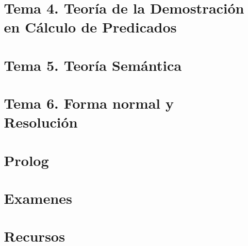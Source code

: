 \documentclass[12pt]{report} %
\begin{document}
\part{Tema 4. Teoría de la Demostración en Cálculo de Predicados}





\part{Tema 5. Teoría  Semántica}







\part{Tema 6. Forma normal y Resolución}






\part{Prolog}





\part{Examenes}











\part{Recursos}


\end{document}
